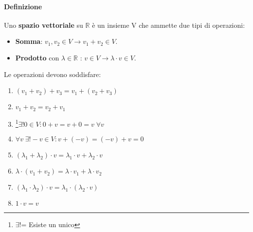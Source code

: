 \documentclass[a4paper, 12pt]{report}
\begin{document}
            \paragraph{Definizione} Uno \textbf{spazio vettoriale} su $\mathbb{R}$ è un insieme V che ammette due tipi di operazioni:
                \begin{itemize}
                    \item \textbf{Somma}: $v_1,v_2 \in V \rightarrow v_1+v_2 \in V$.
                    \item \textbf{Prodotto} con $\lambda \in \mathbb{R}$ : $v \in V \rightarrow \lambda \cdot v \in V$. 
                \end{itemize}
            Le operazioni devono soddisfare:
                \begin{multicols}{2}
                \begin{enumerate}              
                    \item $(v_1+v_2)+v_3 = v_1+(v_2+v_3)$
                    \item $v_1+v_2 = v_2+v_1$
                    \item \footnote{$\exists !$= Esiste un unico}$\exists ! 0 \in V: 0+v=v+0=v \; \forall v$
                    \item $\forall v \; \exists ! -v \in V: v+(-v)=(-v)+v=0$
                    \columnbreak
                    \item $(\lambda_1+\lambda_2)\cdot v = \lambda_1 \cdot v +\lambda_2 \cdot v$
                    \item $\lambda \cdot(v_1+v_2)=\lambda \cdot v_1+\lambda \cdot v_2$
                    \item $(\lambda_1 \cdot \lambda_2)\cdot v = \lambda_1 \cdot(\lambda_2 \cdot v)$
                    \item $1 \cdot v = v$
                \end{enumerate}
                \end{multicols}
\end{document}
